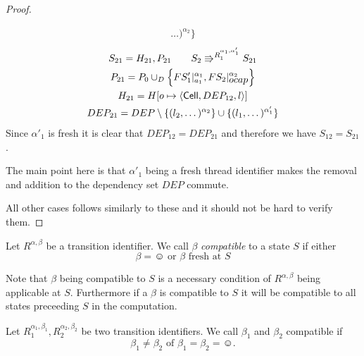 \begin{proof}
\begin{description}
\begin{equation}
\begin{gathered}
          \dots)^{\alpha_2} \}
        \end{gathered}
      \end{equation}
      \begin{equation} 
        \begin{gathered}
          S_{21} = H_{21}, P_{21} \quad\quad S_2 \Rrightarrow^{R_1^{\alpha_1,
          \alpha'_1}} S_{21}
          \\
          P_{21} = P_0 \cup_D \left\{ FS'_1|_{a_1}^{\alpha_1},
          FS_2|_{\mbox{$ocap$}}^{\alpha_2} \right\} \\
          H_{21} = H[o \mapsto \mbox{$\langle \mbox{$\mathsf{Cell}$}{}, DEP_{12}, l \rangle$}] \\ 
          DEP_{21} = DEP \setminus \{ (l_2, \dots)^{\alpha_2} \} \cup \{ (l_1,
          \dots)^{\alpha'_1} \} 
        \end{gathered}
      \end{equation}
      Since $\alpha'_1$ is fresh it is clear that $DEP_{12} = DEP_{21}$ and
      therefore we have $S_{12} = S_{21}$.
      \begin{remark}
        The main point here is that $\alpha'_1$ being a fresh thread identifier
        makes the removal and addition to the dependency set $DEP$ commute.
      \end{remark}
  \end{description}
  All other cases follows similarly to these and it should not be hard to verify
  them.
\end{proof}

\begin{definition} \label{def:betacompat}
  Let $R^{\alpha, \beta}$ be a transition
  identifier. We call $\beta$ \emph{compatible} to a state $S$ if either
  \begin{equation*}
    \beta = \smiley \text{ or } \beta \text{ fresh at } S
  \end{equation*}
\end{definition}
\begin{remark}
  Note that $\beta$ being compatible to $S$ is a necessary condition of
  $R^{\alpha, \beta}$ being applicable at $S$. Furthermore if a $\beta$ is
  compatible to $S$ it will be compatible to all states preceeding $S$ in the
  computation.
\end{remark}

\begin{definition}
  Let $R_1^{\alpha_1, \beta_1}, R_2^{\alpha_2, \beta_2}$ be two transition
  identifiers. We call $\beta_1$ and $\beta_2$ compatible if
  \begin{equation*}
    \beta_1 \neq \beta_2 \text{ of } \beta_1 = \beta_2 = \smiley.
  \end{equation*}
\end{definition}


